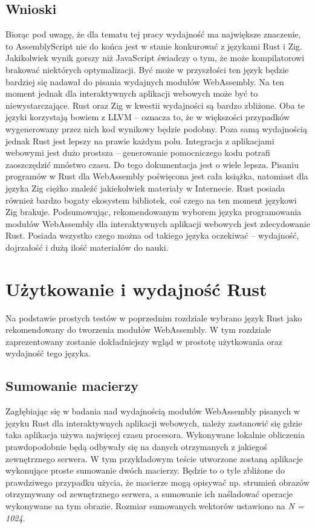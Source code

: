 \documentclass[language=polish,type=master]{aghmodern}
\begin{document}
\section{Wnioski}
Biorąc pod uwagę, że dla tematu tej pracy wydajność ma największe znaczenie, to AssemblyScript nie do końca jest w stanie konkurować z językami Rust i Zig.
Jakikolwiek wynik gorszy niż JavaScript świadczy o tym, że może kompilatorowi brakować niektórych optymalizacji.
Być może w przyszłości ten język będzie bardziej się nadawał do pisania wydajnych modułów WebAssembly.
Na ten moment jednak dla interaktywnych aplikacji webowych może być to niewystarczające.
Rust oraz Zig w kwestii wydajności są bardzo zbliżone.
Oba te języki korzystają bowiem z LLVM -- oznacza to, że w większości przypadków wygenerowany przez nich kod wynikowy będzie podobny.
Poza samą wydajnością jednak Rust jest lepszy na prawie każdym polu.
Integracja z aplikacjami webowymi jest dużo prostsza -- generowanie pomocniczego kodu potrafi zaoszczędzić mnóstwo czasu.
Do tego dokumentacja jest o wiele lepsza.
Pisaniu programów w Rust dla WebAssembly poświęcona jest cała książka, natomiast dla języka Zig ciężko znaleźć jakiekolwiek materiały w Internecie.
Rust posiada również bardzo bogaty ekosystem bibliotek, coś czego na ten moment językowi Zig brakuje.
Podsumowując, rekomendowanym wyborem języka programowania modułów WebAssembly dla interaktywnych aplikacji webowych jest zdecydowanie Rust.
Posiada wszystko czego można od takiego języka oczekiwać -- wydajność, dojrzałość i dużą ilość materiałów do nauki.

\chapter{Użytkowanie i wydajność Rust}
Na podstawie prostych testów w poprzednim rozdziale wybrano język Rust jako rekomendowany do tworzenia modułów WebAssembly.
W tym rozdziale zaprezentowany zostanie dokładniejszy wgląd w prostotę użytkowania oraz wydajność tego języka.

\section{Sumowanie macierzy}
Zagłębiając się w badania nad wydajnością modułów WebAssembly pisanych w języku Rust dla interaktywnych aplikacji webowych, należy zastanowić się gdzie taka aplikacja używa najwięcej czasu procesora.
Wykonywane lokalnie obliczenia prawdopodobnie będą odbywały się na danych otrzymanych z jakiegoś zewnętrznego serwera.
W tym przykładowym teście utworzone zostaną aplikacje wykonujące proste sumowanie dwóch macierzy.
Będzie to o tyle zbliżone do prawdziwego przypadku użycia, że macierze mogą opisywać np. strumień obrazów otrzymywany od zewnętrznego serwera, a sumowanie ich naśladować operacje wykonywane na tym obrazie.
Rozmiar sumowanych wektorów ustawiono na \emph{N = 1024}.
\end{document}
